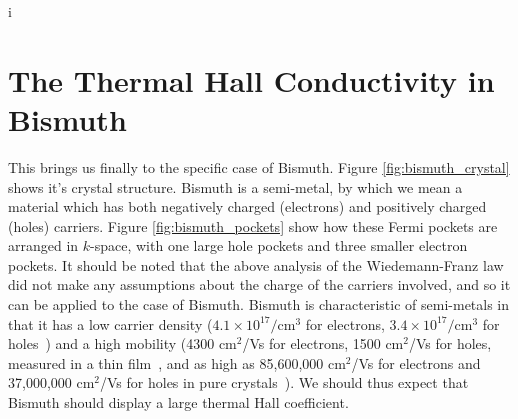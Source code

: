 \documentclass{thesis-umich}
\begin{document}
i\section{The Thermal Hall Conductivity in Bismuth}

This brings us finally to the specific case of Bismuth. Figure
\ref{fig:bismuth_crystal} shows it's crystal structure. Bismuth is a
semi-metal, by which we mean a material which has both negatively charged
(electrons) and positively charged (holes) carriers. Figure \ref{fig:bismuth_pockets} show how these Fermi pockets are arranged in $k$-space, with one large hole pockets and three smaller electron pockets. It should be noted that
the above analysis of the Wiedemann-Franz law did not make any assumptions
about the charge of the carriers involved, and so it can be applied to the case
of Bismuth. Bismuth is characteristic of semi-metals in that it has a low
carrier density ($4.1 \times 10^{17} /$cm$^3$ for electrons, $3.4 \times
10^{17} /$cm$^3$ for holes~\cite{Jain1962}) and a high mobility (4300 cm$^2$/Vs
for electrons, 1500 cm$^2$/Vs for holes, measured in a thin
film~\cite{Rosenbaum2004}, and as high as 85,600,000 cm$^2$/Vs for electrons
and 37,000,000 cm$^2$/Vs for holes in pure crystals~\cite{Gallo1963}). We
should thus expect that Bismuth should display a large thermal Hall coefficient.
\end{document}

